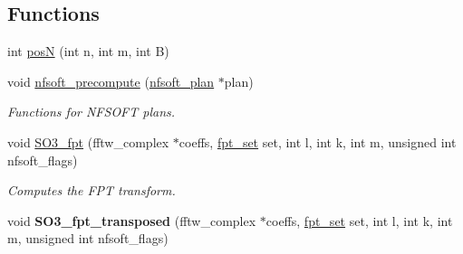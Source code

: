 \subsection*{Functions}
\begin{CompactItemize}
\item 
\hypertarget{group__nfsoft_gaec46df0644d73d48cea150cefffffae}{
int \hyperlink{group__nfsoft_gaec46df0644d73d48cea150cefffffae}{posN} (int n, int m, int B)}
\label{group__nfsoft_gaec46df0644d73d48cea150cefffffae}

\item 
void \hyperlink{group__nfsoft_g123df5d17a0d43fe5e061ac0fb8c1d23}{nfsoft\_\-precompute} (\hyperlink{structnfsoft__plan}{nfsoft\_\-plan} $\ast$plan)
\begin{CompactList}\small\item\em Functions for NFSOFT plans. \item\end{CompactList}\item 
void \hyperlink{group__nfsoft_gfdc0cc0432918bfa8643c7a5f42d7ea5}{SO3\_\-fpt} (fftw\_\-complex $\ast$coeffs, \hyperlink{group__fpt_g73d630ac21d6474ba0693f124d465e15}{fpt\_\-set} set, int l, int k, int m, unsigned int nfsoft\_\-flags)
\begin{CompactList}\small\item\em Computes the FPT transform. \item\end{CompactList}\item 
\hypertarget{group__nfsoft_g9cfa0279bc0f6ad32d69cb17dbd206a8}{
void \textbf{SO3\_\-fpt\_\-transposed} (fftw\_\-complex $\ast$coeffs, \hyperlink{group__fpt_g73d630ac21d6474ba0693f124d465e15}{fpt\_\-set} set, int l, int k, int m, unsigned int nfsoft\_\-flags)}
\label{group__nfsoft_g9cfa0279bc0f6ad32d69cb17dbd206a8}


\end{CompactItemize}
